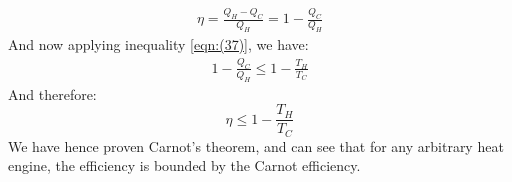 \begin{align*}
    \eta = \frac{Q_H-Q_C}{Q_H} = 1 - \frac{Q_C}{Q_H}
\end{align*}
And now applying inequality \ref{eqn:(37)}, we have:
\begin{align*}
    1 - \frac{Q_C}{Q_H} \leq 1 - \frac{T_H}{T_C}
\end{align*}
And therefore:
\begin{equation}
    \eta \leq 1 - \frac{T_H}{T_C}
\end{equation}
We have hence proven Carnot's theorem, and can see that for any arbitrary heat engine, the efficiency is bounded by the Carnot efficiency. 
